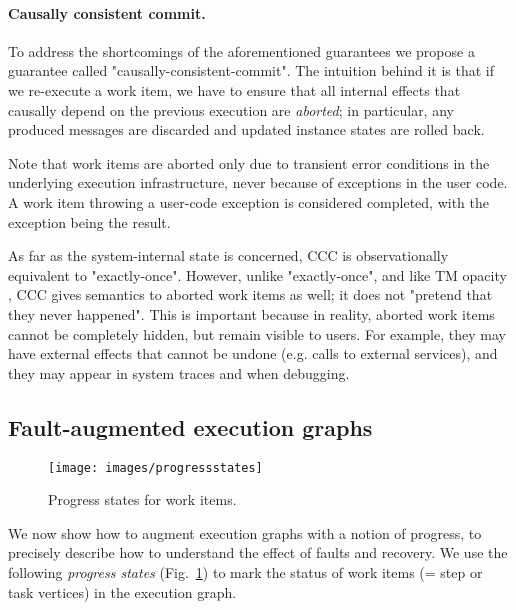 
\paragraph{Causally consistent commit.}
To address the shortcomings of the aforementioned guarantees we propose a guarantee called "causally-consistent-commit". 
The intuition behind it is that if we re-execute a work item, we have to ensure that all internal effects that causally depend on the previous execution are \emph{aborted}; in particular, any produced messages are discarded and updated instance states are rolled back. 

Note that work items are aborted only due to transient error conditions in the underlying execution infrastructure, never because of exceptions in the user code. A work item throwing a user-code exception is considered completed, with the exception being the result. 

As far as the system-internal state is concerned, CCC is observationally equivalent to "exactly-once". However, unlike "exactly-once", and like TM opacity \cite{opacity}, CCC gives semantics to aborted work items as well; it does not "pretend that they never happened". This is important because in reality, aborted work items cannot be completely hidden, but remain visible to users. For example, they may have external effects that cannot be undone (e.g. calls to external services), and they may appear in system traces and when debugging. 

\subsection{Fault-augmented execution graphs}

\begin{figure}[t]
    \centering
    \texttt{[image: images/progressstates]}
    \caption{Progress states for work items.}
    \label{fig:progressstates}
\end{figure}

We now show how to augment execution graphs with a notion of progress, to precisely describe how to understand the effect of faults and recovery. We use the following \emph{progress states} (Fig.~\ref{fig:progressstates}) to mark the status of work items (= step or task vertices) in the execution graph.

